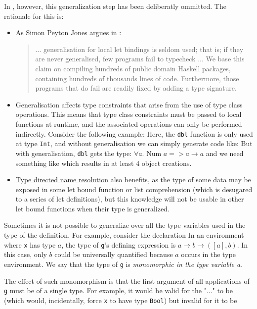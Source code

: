 In \frege{}, however, this generalization step has been deliberatly ommitted. The rationale for this is:
\begin{itemize}
\item As Simon Peyton Jones argues in \cite{lsnbg}:
\begin{quote}
... generalisation for local let bindings is seldom used; that is; if they are never generalised, few programs fail to typecheck ... We base this claim on compiling hundreds of public domain Haskell packages, containing hundreds of thousands lines of code. Furthermore, those programs that do fail are readily fixed by adding a type signature.
\end{quote}
\item Generalisation affects type constraints that arise from the use of type class operations. This means that type class constraints must be passed to local functions at runtime, and the associated operations can only be performed indirectly. Consider the following example: 
Here, the \texttt{dbl} function is only used at type \texttt{Int}, and without generalisation we can simply generate \java{} code like: 
But with generalisation, \texttt{dbl} gets the type:  $\forall a.$ Num $a => a \rightarrow{} a$ and we need something like 
which results in at least 4 object creations.
\item \hyperref[tdnr]{Type directed name resolution} also benefits, as the type of some data may be exposed in some let bound function or list comprehension (which is desugared to a series of let definitions), but this knowledge will not be usable in other let bound functions when their type is generalized.
\end{itemize}

Sometimes it is not possible to generalize over all the type variables used in the type of the definition. For example, consider the declaration  
In an environment where \texttt{x} has type $a$, the type of \texttt{g}'s defining expression is $a \rightarrow{} b \rightarrow{} ([a],b)$. In this case, only $b$ could be universally quantified because $a$ occurs in the type environment. We say that the type of \texttt{g} is \emph{monomorphic in the type variable a}.

The effect of such monomorphism is that the first argument of all applications of \texttt{g} must be of a single type. For example, it would be valid for the "..." to be 
(which would, incidentally, force \texttt{x} to have type \texttt{Bool}) but invalid for it to be 

